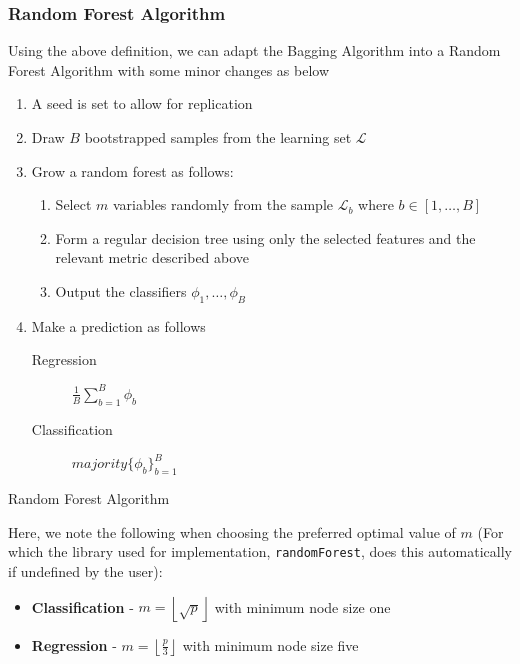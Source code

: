 \documentclass[11pt,a4paper]{report}
\begin{document}
\subsubsection{Random Forest Algorithm}
Using the above definition, we can adapt the Bagging Algorithm into a Random Forest Algorithm with some minor changes as below
\begin{algorithm}
\SetAlgoLined
\begin{enumerate}
    \item A seed is set to allow for replication
    
    \item Draw $B$ bootstrapped samples from the learning set $\mathcal{L}$
        
    \item Grow a random forest as follows:
    \begin{enumerate}
        \item Select $m$ variables randomly from the sample $\mathcal{L}_b$ where $b \in [1, \dots, B]$
        
        \item Form a regular decision tree using only the selected features and the relevant metric described above
        
        \item Output the classifiers $\phi_1, \dots, \phi_B$
    \end{enumerate}
    
    \item Make a prediction as follows
    \begin{description}
        \item[Regression] $ \frac{1}{B} \sum_{b=1}^{B} \phi_b $
        
        \item[Classification] $majority \{\phi_b\}_{b=1}^{B}$
    \end{description}
\end{enumerate}
\caption{Random Forest Algorithm}
\end{algorithm}
Here, we note the following when choosing the preferred optimal value of $m$ (For which the library used for implementation, {\color{blue} \texttt{randomForest}}, does this automatically if undefined by the user):
\begin{itemize}
    \item \textbf{Classification} - $m = \left \lfloor{\sqrt{p}} \right \rfloor$ with minimum node size one
    
    \item \textbf{Regression} - $m = \left \lfloor{\frac{p}{3}} \right \rfloor$ with minimum node size five
\end{itemize}
\end{document}
